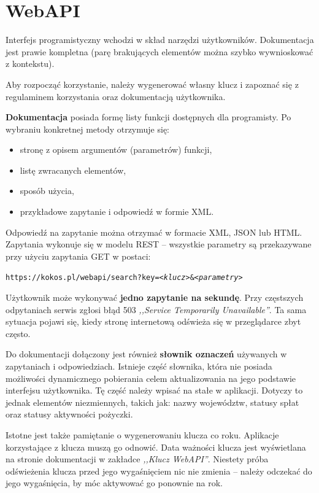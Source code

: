 \documentclass[a4paper,twoside,titlepage,openright]{book}
\begin{document}
\section{WebAPI}

Interfejs programistyczny wchodzi w skład narzędzi użytkowników. Dokumentacja \cite{kokosPlApi} jest prawie kompletna (parę brakujących elementów można szybko wywnioskować z kontekstu). 

Aby rozpocząć korzystanie, należy wygenerować własny klucz i zapoznać się z regulaminem korzystania oraz dokumentacją użytkownika. 

\textbf{Dokumentacja} posiada formę listy funkcji dostępnych dla programisty. Po wybraniu konkretnej metody otrzymuje się:

\begin{itemize}
\item stronę z opisem argumentów (parametrów) funkcji,
\item listę zwracanych elementów,
\item sposób użycia, 
\item przykładowe zapytanie i odpowiedź w formie XML.
\end{itemize}

Odpowiedź na zapytanie można otrzymać w formacie XML, JSON lub HTML. Zapytania wykonuje się w modelu REST -- wszystkie parametry są przekazywane przy użyciu zapytania GET w postaci:  

\begin{center}
\texttt{https://kokos.pl/webapi/search?key=\textit{<klucz>}\&\textit{<parametry>}}
\end{center}

Użytkownik może wykonywać \textbf{jedno zapytanie na sekundę}. Przy częstszych odpytaniach serwis zgłosi błąd 503 \textit{,,Service Temporarily Unavailable''}. Ta sama sytuacja pojawi się, kiedy stronę internetową odświeża się w przeglądarce zbyt często. 

Do dokumentacji dołączony jest również \textbf{słownik oznaczeń} używanych w zapytaniach i odpowiedziach. Istnieje część słownika, która nie posiada możliwości dynamicznego pobierania celem aktualizowania na jego podstawie interfejsu użytkownika. Tę część należy wpisać na stałe w aplikacji. Dotyczy to jednak elementów niezmiennych, takich jak: nazwy województw, statusy spłat oraz statusy aktywności pożyczki. 

Istotne jest także pamiętanie o wygenerowaniu klucza co roku. Aplikacje korzystające z klucza muszą go odnowić. Data ważności klucza jest wyświetlana na stronie dokumentacji w zakładce \textit{,,Klucz WebAPI''}. Niestety próba odświeżenia klucza przed jego wygaśnięciem nic nie zmienia -- należy odczekać do jego wygaśnięcia, by móc aktywować go ponownie na rok. 
\end{document}
